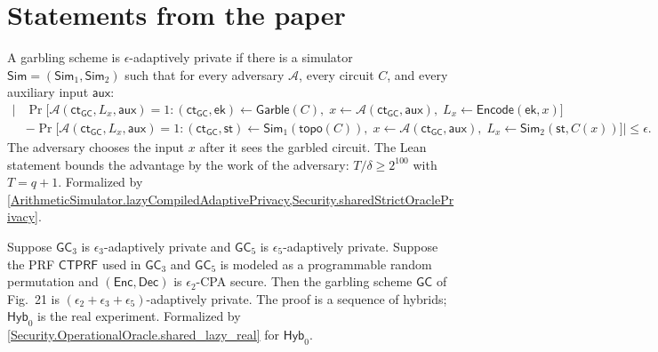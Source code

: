 
\section{Statements from the paper}

\begin{paperdef}\label{babe:def3-privacy}
A garbling scheme is $\epsilon$-adaptively private if there is a simulator $\mathsf{Sim} = (\mathsf{Sim}_1, \mathsf{Sim}_2)$ such that for every adversary $\mathcal{A}$, every circuit $C$, and every auxiliary input $\mathsf{aux}$:
\begin{align*}
  \Big| &\Pr\big[ \mathcal{A}(\mathsf{ct}_{\mathsf{GC}}, L_x, \mathsf{aux}) = 1 : (\mathsf{ct}_{\mathsf{GC}}, \mathsf{ek}) \gets \mathsf{Garble}(C),\; x \gets \mathcal{A}(\mathsf{ct}_{\mathsf{GC}}, \mathsf{aux}),\; L_x \gets \mathsf{Encode}(\mathsf{ek}, x) \big] \\
  &- \Pr\big[ \mathcal{A}(\mathsf{ct}_{\mathsf{GC}}, L_x, \mathsf{aux}) = 1 : (\mathsf{ct}_{\mathsf{GC}}, \mathsf{st}) \gets \mathsf{Sim}_1(\mathsf{topo}(C)),\; x \gets \mathcal{A}(\mathsf{ct}_{\mathsf{GC}}, \mathsf{aux}),\; L_x \gets \mathsf{Sim}_2(\mathsf{st}, C(x)) \big] \Big| \leq \epsilon .
\end{align*}
The adversary chooses the input $x$ after it sees the garbled circuit.
The Lean statement bounds the advantage by the work of the adversary: $T / \delta \geq 2^{100}$ with $T = q + 1$.
Formalized by \cref{ArithmeticSimulator.lazyCompiledAdaptivePrivacy,Security.sharedStrictOraclePrivacy}.
\end{paperdef}

\begin{paperthm}\label{babe:thm7}
Suppose $\mathsf{GC}_3$ is $\epsilon_3$-adaptively private and $\mathsf{GC}_5$ is $\epsilon_5$-adaptively private.
Suppose the PRF $\mathsf{CTPRF}$ used in $\mathsf{GC}_3$ and $\mathsf{GC}_5$ is modeled as a programmable random permutation and $(\mathsf{Enc}, \mathsf{Dec})$ is $\epsilon_2$-CPA secure.
Then the garbling scheme $\mathsf{GC}$ of Fig.~21 is $(\epsilon_2 + \epsilon_3 + \epsilon_5)$-adaptively private.
The proof is a sequence of hybrids; $\mathsf{Hyb}_0$ is the real experiment.
Formalized by \cref{Security.OperationalOracle.shared_lazy_real} for $\mathsf{Hyb}_0$.
\end{paperthm}

